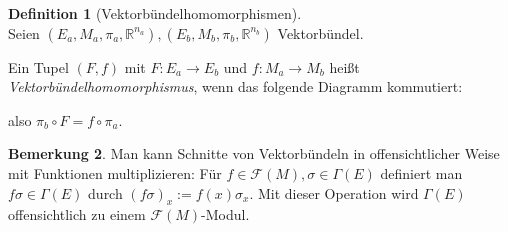 \documentclass[a4paper]{scrreprt}
\numberwithin{equation}{chapter}
\newcommand{\R}{\mathbb{R}}
\newcommand{\sm}{\mathcal{F}}
\theoremstyle{definition}
\newtheorem{defn}{Definition}[section]
\newtheorem{bem}[defn]{Bemerkung}
\begin{document}
		\begin{defn}[Vektorbündelhomomorphismen]\hfill\\
			Seien $(E_a,M_a,\pi_a,\R^{n_a}),(E_b,M_b,\pi_b,\R^{n_b})$ Vektorbündel.
			
			Ein Tupel $(F,f)$ mit $F\colon E_a\rightarrow E_b$ und $f\colon M_a\rightarrow M_b$ heißt \emph{Vektorbündelhomomorphismus}, wenn das folgende Diagramm kommutiert:
			\begin{center}
			\end{center}
			also $\pi_b\circ F=f\circ\pi_a$.
		\end{defn}
		
		
		\begin{bem}
			Man kann Schnitte von Vektorbündeln in offensichtlicher Weise mit Funktionen multiplizieren: Für $f \in \sm(M), \sigma \in \Gamma(E)$ definiert man $f\sigma \in \Gamma(E)$ durch $(f\sigma)_x := f(x) \sigma_x$. Mit dieser Operation wird $\Gamma(E)$ offensichtlich zu einem $\sm(M)$-Modul.
		\end{bem}
\end{document}
